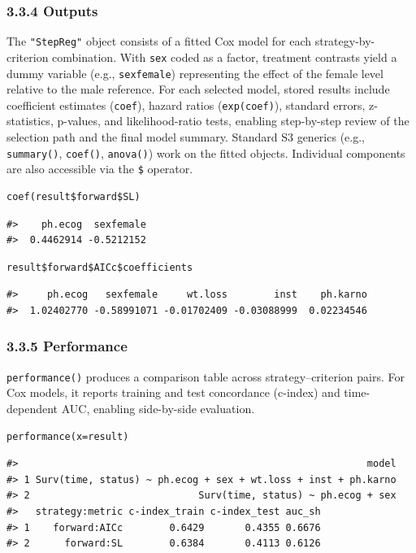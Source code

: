 \subsubsection{3.3.4 Outputs}\label{outputs}

The \texttt{"StepReg"} object consists of a fitted Cox model for each strategy-by-criterion combination. With \texttt{sex} coded as a factor, treatment contrasts yield a dummy variable (e.g., \texttt{sexfemale}) representing the effect of the female level relative to the male reference. For each selected model, stored results include coefficient estimates (\texttt{coef}), hazard ratios (\texttt{exp(coef)}), standard errors, z-statistics, p-values, and likelihood-ratio tests, enabling step-by-step review of the selection path and the final model summary. Standard S3 generics (e.g., \texttt{summary()}, \texttt{coef()}, \texttt{anova()}) work on the fitted objects. Individual components are also accessible via the \texttt{\$} operator.

\begin{verbatim}
coef(result$forward$SL)
\end{verbatim}

\begin{verbatim}
#>    ph.ecog  sexfemale 
#>  0.4462914 -0.5212152
\end{verbatim}

\begin{verbatim}
result$forward$AICc$coefficients
\end{verbatim}

\begin{verbatim}
#>     ph.ecog   sexfemale     wt.loss        inst    ph.karno 
#>  1.02402770 -0.58991071 -0.01702409 -0.03088999  0.02234546
\end{verbatim}

\subsubsection{3.3.5 Performance}\label{performance-1}

\texttt{performance()} produces a comparison table across strategy--criterion pairs. For Cox models, it reports training and test concordance (c-index) and time-dependent AUC, enabling side-by-side evaluation.

\begin{verbatim}
performance(x=result)
\end{verbatim}

\begin{verbatim}
#>                                                            model
#> 1 Surv(time, status) ~ ph.ecog + sex + wt.loss + inst + ph.karno
#> 2                             Surv(time, status) ~ ph.ecog + sex
#>   strategy:metric c-index_train c-index_test auc_sh
#> 1    forward:AICc        0.6429       0.4355 0.6676
#> 2      forward:SL        0.6384       0.4113 0.6126
\end{verbatim}

